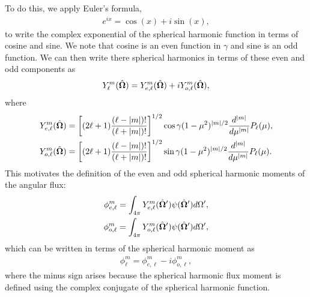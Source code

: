 To do this, we apply Euler's formula,
\begin{align}
  e^{ix} = \cos(x) + i \sin(x) ,
\end{align}
to write the complex exponential of the spherical harmonic function in terms of cosine and sine. We note that cosine is an even function in $\gamma$ and sine is an odd function. We can then write there spherical harmonics in terms of these even and odd components as
\begin{align} \label{Eq:transport_sphericalHarmonics_evenOddExpansion}
  Y_\ell^m(\hat{\mathbf{\Omega}}) = Y_{e,\ell}^m(\hat{\mathbf{\Omega}}) + i Y_{o,\ell}^m(\hat{\mathbf{\Omega}}) ,
\end{align}
where
\begin{subequations}
\begin{align}
  Y_{e,\ell}^m(\hat{\mathbf{\Omega}}) &= \left[ ( 2\ell + 1 ) \frac{ ( \ell - | m | ) ! }{ ( \ell + | m | )! } \right]^{1/2} \cos\gamma ( 1 - \mu^2 )^{|m|/2} \frac{d^{|m|}}{d\mu^{|m|}} P_\ell(\mu) , \\
  Y_{o,\ell}^m(\hat{\mathbf{\Omega}}) &= \left[ ( 2\ell + 1 ) \frac{ ( \ell - | m | ) ! }{ ( \ell + | m | )! } \right]^{1/2} \sin\gamma ( 1 - \mu^2 )^{|m|/2} \frac{d^{|m|}}{d\mu^{|m|}} P_\ell(\mu) .
\end{align}
\end{subequations}
This motivates the definition of the even and odd spherical harmonic moments of the angular flux:
\begin{subequations}
\begin{align}
  \phi_{e,\ell}^m = \int_{4\pi}  Y_{e,\ell}^m (\hat{\mathbf{\Omega}}') \psi(\hat{\mathbf{\Omega}}') d\Omega' , \\
  \phi_{o,\ell}^m = \int_{4\pi}  Y_{o,\ell}^m (\hat{\mathbf{\Omega}}') \psi(\hat{\mathbf{\Omega}}') d\Omega' ,
\end{align}
\end{subequations}
which can be written in terms of the spherical harmonic moment as
\begin{align} \label{Eq:transport_sphericalHarmonicFluxMoments_evenOddExpansion}
  \phi_\ell^m = \phi_{e,\ell}^m - i \phi_{o,\ell}^m ,
\end{align}
where the minus sign arises because the spherical harmonic flux moment is defined using the complex conjugate of the spherical harmonic function.

